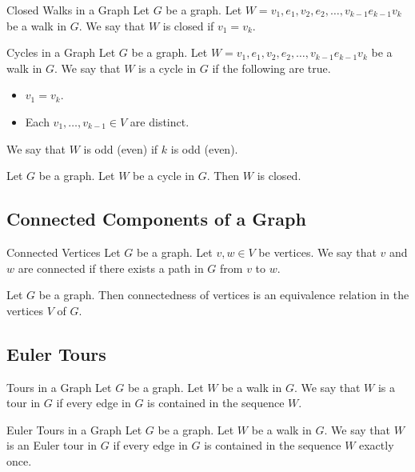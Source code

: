\documentclass[a4paper]{article}
\begin{document}
\begin{defn}{Closed Walks in a Graph}{} Let $G$ be a graph. Let $W=v_1,e_1,v_2,e_2,\dots,v_{k-1}e_{k-1}v_k$ be a walk in $G$. We say that $W$ is closed if $v_1=v_k$. 
\end{defn}

\begin{defn}{Cycles in a Graph}{} Let $G$ be a graph. Let $W=v_1,e_1,v_2,e_2,\dots,v_{k-1}e_{k-1}v_k$ be a walk in $G$. We say that $W$ is a cycle in $G$ if the following are true. 
\begin{itemize}
\item $v_1=v_k$. 
\item Each $v_1,\dots,v_{k-1}\in V$ are distinct. 
\end{itemize}
We say that $W$ is odd (even) if $k$ is odd (even). 
\end{defn}

\begin{lmm}{}{} Let $G$ be a graph. Let $W$ be a cycle in $G$. Then $W$ is closed. 
\end{lmm}

\subsection{Connected Components of a Graph}
\begin{defn}{Connected Vertices}{} Let $G$ be a graph. Let $v,w\in V$ be vertices. We say that $v$ and $w$ are connected if there exists a path in $G$ from $v$ to $w$. 
\end{defn}

\begin{lmm}{}{} Let $G$ be a graph. Then connectedness of vertices is an equivalence relation in the vertices $V$ of $G$. 
\end{lmm}

\subsection{Euler Tours}
\begin{defn}{Tours in a Graph}{} Let $G$ be a graph. Let $W$ be a walk in $G$. We say that $W$ is a tour in $G$ if every edge in $G$ is contained in the sequence $W$. 
\end{defn}

\begin{defn}{Euler Tours in a Graph}{} Let $G$ be a graph. Let $W$ be a walk in $G$. We say that $W$ is an Euler tour in $G$ if every edge in $G$ is contained in the sequence $W$ exactly once. 
\end{defn}
\end{document}
